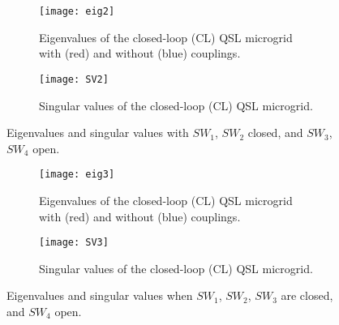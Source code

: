 \documentclass[a4paper]{article}
\theoremstyle{plain}
\begin{document}
      \begin{figure}[!htb]
                      \centering
                      \begin{subfigure}[!htb]{0.48\textwidth}
                        \centering
                        \texttt{[image: eig2]}
                        \caption{Eigenvalues of the closed-loop (CL) QSL microgrid with (red) and without (blue) couplings.}
                        \label{fig:Matlab2a}
                      \end{subfigure}
                      \begin{subfigure}[!htb]{0.48\textwidth}
                        \centering
                        \texttt{[image: SV2]}
                        \caption{Singular values of the closed-loop (CL) QSL microgrid.}
                        \label{fig:Matlab2b}
                      \end{subfigure}
		\caption{Eigenvalues and singular values with $SW_1$, $SW_2$ closed, and $SW_3$, $SW_4$ open.}
		\label{Fig6:Matlab2}
                    \end{figure}
 \begin{figure}[!htb]
                      \centering
       \begin{subfigure}[!htb]{0.48\textwidth}
                        \centering
                        \texttt{[image: eig3]}
                        \caption{Eigenvalues of the closed-loop (CL) QSL microgrid with (red) and without (blue) couplings.}
                        \label{fig:Matlab3a}
                      \end{subfigure}
                      \begin{subfigure}[!htb]{0.48\textwidth}
                        \centering
                        \texttt{[image: SV3]}
                        \caption{Singular values of the closed-loop (CL) QSL microgrid.}
                        \label{fig:Matlab3b}
                      \end{subfigure}
		\caption{Eigenvalues and singular values when $SW_1$, $SW_2$, $SW_3$ are closed, and $SW_4$ open.}
		\label{Fig6:Matlab3}

\end{figure}
\end{document}
